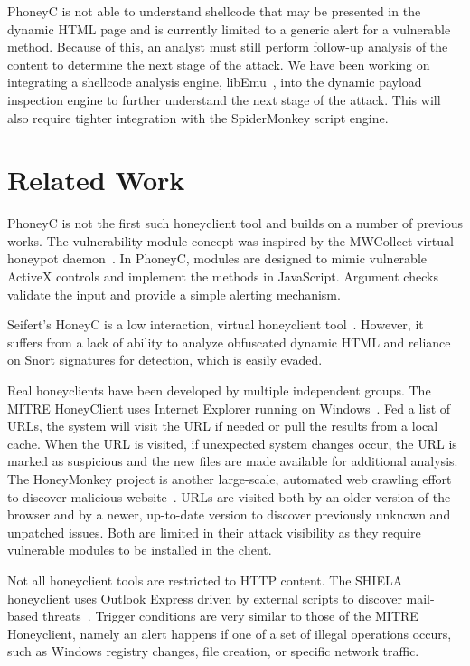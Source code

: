 \documentclass[10pt,twocolumn]{article}
\begin{document}
PhoneyC is not able to understand shellcode that may be presented in the dynamic HTML page and is currently limited to a generic alert for a vulnerable method. Because of this, an analyst must still perform follow-up analysis of the content to determine the next stage of the attack. We have been working on integrating a shellcode analysis engine, libEmu~\cite{libemu}, into the dynamic payload inspection engine to further understand the next stage of the attack. This will also require tighter integration with the SpiderMonkey script engine. 

\section{Related Work}
\label{related-work}

PhoneyC is not the first such honeyclient tool and builds on a number of previous works. The vulnerability module concept was inspired by the MWCollect virtual honeypot daemon~\cite{freiling2005bte}. In PhoneyC, modules are designed to mimic vulnerable ActiveX controls and implement the methods in JavaScript. Argument checks validate the input and provide a simple alerting mechanism. 

Seifert's HoneyC is a low interaction, virtual honeyclient tool~\cite{seifert2006hli}. However, it suffers from a lack of ability to analyze obfuscated dynamic HTML and reliance on Snort signatures for detection, which is easily evaded.

Real honeyclients have been developed by multiple independent groups. The MITRE HoneyClient uses Internet Explorer running on Windows~\cite{wang2005uhd}. Fed a list of URLs, the system will visit the URL if needed or pull the results from a local cache. When the URL is visited, if unexpected system changes occur, the URL is marked as suspicious and the new files are made available for additional analysis. The HoneyMonkey project is another large-scale, automated web crawling effort to discover malicious website~\cite{wang2006awp}. URLs are visited both by an older version of the browser and by a newer, up-to-date version to discover previously unknown and unpatched issues. Both are limited in their attack visibility as they require vulnerable modules to be installed in the client.

Not all honeyclient tools are restricted to HTTP content. The SHIELA honeyclient uses Outlook Express driven by external scripts to discover mail-based threats~\cite{rocaspana:sch}. Trigger conditions are very similar to those of the MITRE Honeyclient, namely an alert happens if one of a set of illegal operations occurs, such as Windows registry changes, file creation, or specific network traffic. 
\end{document}

